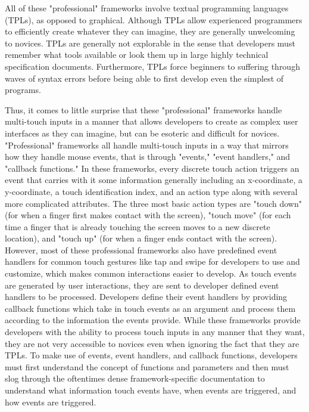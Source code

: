 All of these "professional" frameworks involve textual programming languages (TPLs), as opposed to graphical. Although TPLs allow experienced programmers to efficiently create whatever they can imagine, they are generally unwelcoming to novices. TPLs are generally not explorable in the sense that developers must remember what tools available or look them up in large highly technical specification documents. Furthermore, TPLs  force beginners to suffering through waves of syntax errors before being able to first develop even the simplest of programs.

Thus, it comes to little surprise that these "professional" frameworks handle multi-touch inputs in a manner that allows developers to create as complex user interfaces as they can imagine, but can be esoteric and difficult for novices. "Professional" frameworks all handle multi-touch inputs in a way that mirrors how they handle mouse events, that is through "events," "event handlers," and "callback functions." In these frameworks, every discrete touch action triggers an event that carries with it some information generally including an x-coordinate, a y-coordinate, a touch identification index, and an action type along with several more complicated attributes. The three most basic action types are "touch down" (for when a finger first makes contact with the screen), "touch move" (for each time a finger that is already touching the screen moves to a new discrete location), and "touch up" (for when a finger ends contact with the screen). However, most of these professional frameworks also have predefined event handlers for common touch gestures like tap and swipe for developers to use and customize, which makes common interactions easier to develop. As touch events are generated by user interactions, they are sent to developer defined event handlers to be processed. Developers define their event handlers by providing callback functions which take in touch events as an argument and process them according to the information the events provide. While these frameworks provide developers with the ability to process touch inputs in any manner that they want, they are not very accessible to novices even when ignoring the fact that they are TPLs. To make use of events, event handlers, and callback functions, developers must first understand the concept of functions and parameters and then must slog through the oftentimes dense framework-specific documentation to understand what information touch events have, when events are triggered, and how events are triggered. 

